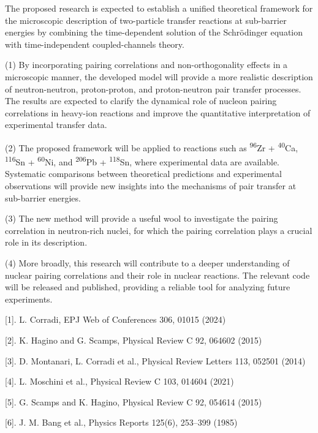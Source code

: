\documentclass[10pt]{article}
\newcommand{\plansub}[1]{\par\vspace{0.9em}\noindent{\fontsize{11}{13.5}\selectfont\bfseries #1}\par\vspace{0.3em}}
\newenvironment{planlist}{\begin{list}{}{\setlength{\leftmargin}{2.2em}\setlength{\itemindent}{-2.2em}\setlength{\itemsep}{3pt}\setlength{\topsep}{3pt}\setlength{\parsep}{0pt}}}{\end{list}}
\begin{document}
\plansub{Expected results and impacts}

The proposed research is expected to establish a unified theoretical framework for the microscopic description of two-particle transfer reactions at sub-barrier energies by combining the time-dependent solution of the Schrödinger equation with time-independent coupled-channels theory.
\par\begin{planlist}
\item[] (1) By incorporating pairing correlations and non-orthogonality effects in a microscopic manner, the developed model will provide a more realistic description of neutron-neutron, proton-proton, and proton-neutron pair transfer processes. The results are expected to clarify the dynamical role of nucleon pairing correlations in heavy-ion reactions and improve the quantitative interpretation of experimental transfer data.
\item[] (2) The proposed framework will be applied to reactions such as \textsuperscript{96}Zr + \textsuperscript{40}Ca, \textsuperscript{116}Sn + \textsuperscript{60}Ni, and \textsuperscript{206}Pb + \textsuperscript{118}Sn, where experimental data are available. Systematic comparisons between theoretical predictions and experimental observations will provide new insights into the mechanisms of pair transfer at sub-barrier energies.
\item[] (3) The new method will provide a useful wool to investigate the pairing correlation in neutron-rich nuclei, for which the pairing correlation plays a crucial role in its description.
\item[] (4) More broadly, this research will contribute to a deeper understanding of nuclear pairing correlations and their role in nuclear reactions. The relevant code will be released and published, providing a reliable tool for analyzing future experiments.

\end{planlist}
\setlength{\parskip}{0pt}
\plansub{Reference:}

[1]. L. Corradi, EPJ Web of Conferences 306, 01015 (2024)

[2]. K. Hagino and G. Scamps, Physical Review C 92, 064602 (2015)

[3]. D. Montanari, L. Corradi et al., Physical Review Letters 113, 052501 (2014)

[4]. L. Moschini et al., Physical Review C 103, 014604 (2021)

[5]. G. Scamps and K. Hagino, Physical Review C 92, 054614 (2015)

[6]. J. M. Bang et al., Physics Reports 125(6), 253--399 (1985)
\end{document}
